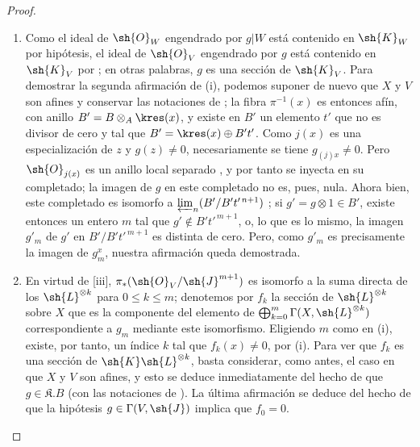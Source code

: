 \documentclass[oneside,10pt]{amsart}
\renewcommand{\leq}{\leqslant}
\begin{document}
\begin{proof}
\begin{enumerate}
    \item[\rm{(i)}] Como el ideal de $\sh{O}_W$ engendrado por $g|W$ está contenido en $\sh{K}_W$ por hipótesis, el ideal de $\sh{O}_V$ engendrado por $g$ está contenido en $\sh{K}_V$ por ; en otras palabras, $g$ es una sección de $\sh{K}_V$.
        Para demostrar la segunda afirmación de (i), podemos suponer de nuevo que $X$ y $V$ son afines y conservar las notaciones de ;
        la fibra $\pi^{-1}(x)$ es entonces afín, con anillo $B'=B\otimes_A\kres(x)$, y existe en $B'$ un elemento $t'$ que no es divisor de cero y tal que $B'=\kres(x)\oplus B't'$.
        Como $j(x)$ es una especialización de $z$ y $g(z)\neq0$, necesariamente se tiene $g_{(j)x}\neq0$.
        Pero $\sh{O}_{j(x)}$ es un anillo local separado , y por tanto se inyecta en su completado; la imagen de $g$ en este completado no es, pues, nula.
        Ahora bien, este completado es isomorfo a $\varprojlim_n(B'/B't'^{\,n+1})$ ;
        si $g'=g\otimes1\in B'$, existe entonces un entero $m$ tal que $g'\notin B't'^{\,m+1}$, o, lo que es lo mismo, la imagen $g'_m$ de $g'$ en $B'/B't'^{\,m+1}$ es distinta de cero.
        Pero, como $g'_m$ es precisamente la imagen de $g_m^x$, nuestra afirmación queda demostrada.
    \item[\rm{(ii)}] En virtud de [iii], $\pi_*(\sh{O}_V/\sh{J}^{m+1})$ es isomorfo a la suma directa de los $\sh{L}^{\otimes k}$ para $0\leq k\leq m$;
        denotemos por $f_k$ la sección de $\sh{L}^{\otimes k}$ sobre $X$ que es la componente del elemento de $\bigoplus_{k=0}^m\Gamma(X,\sh{L}^{\otimes k})$ correspondiente a $g_m$ mediante este isomorfismo.
        Eligiendo $m$ como en (i), existe, por tanto, un índice $k$ tal que $f_k(x)\neq0$, por (i).
        Para ver que $f_k$ es una sección de $\sh{K}\sh{L}^{\otimes k}$, basta considerar, como antes, el caso en que $X$ y $V$ son afines, y esto se deduce inmediatamente del hecho de que $g\in\mathfrak{K}.B$ (con las notaciones de ).
        La última afirmación se deduce del hecho de que la hipótesis $g\in\Gamma(V,\sh{J})$ implica que $f_0=0$.
\end{enumerate}
\end{proof}
\end{document}
